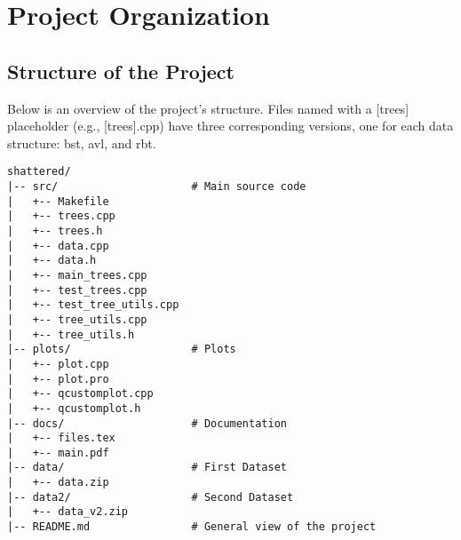 \section{Project Organization}

\subsection{Structure of the Project}
Below is an overview of the project's structure. Files named with a [trees] placeholder (e.g., [trees].cpp) have three corresponding versions, one for each data structure: bst, avl, and rbt.


\begin{verbatim}
shattered/
|-- src/                     # Main source code
|   +-- Makefile          
|   +-- trees.cpp          
|   +-- trees.h 
|   +-- data.cpp
|   +-- data.h 
|   +-- main_trees.cpp 
|   +-- test_trees.cpp 
|   +-- test_tree_utils.cpp 
|   +-- tree_utils.cpp 
|   +-- tree_utils.h 
|-- plots/                   # Plots
|   +-- plot.cpp
|   +-- plot.pro
|   +-- qcustomplot.cpp
|   +-- qcustomplot.h
|-- docs/                    # Documentation
|   +-- files.tex
|   +-- main.pdf
|-- data/                    # First Dataset
|   +-- data.zip
|-- data2/                   # Second Dataset
|   +-- data_v2.zip                        
|-- README.md                # General view of the project
\end{verbatim}